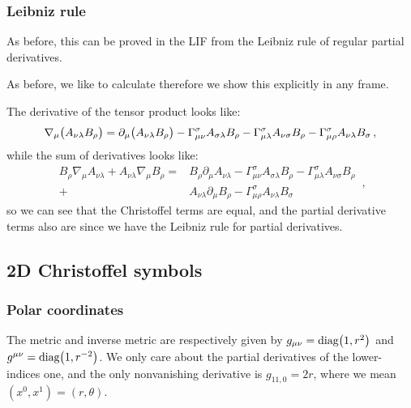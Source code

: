 \documentclass[main.tex]{subfiles}
\begin{document}
\subsubsection{Leibniz rule}

As before, this can be proved in the LIF from the Leibniz rule of regular partial derivatives.

As before, we like to calculate therefore we show this explicitly in any frame.

The derivative of the tensor product looks like: 
%
\begin{equation}
    \nabla_{\mu } \qty(A_{\nu \lambda } B_{ \rho }) = 
    \partial_{\mu }\qty(A_{\nu \lambda }B_{\rho }) 
    -\Gamma_{\mu \nu }^{\sigma }A_{\sigma \lambda }B_{\rho }
    -\Gamma_{\mu \lambda  }^{\sigma }A_{\nu \sigma }B_{\rho }
    -\Gamma_{\mu \rho }^{\sigma }A_{\nu \lambda }B_{\sigma }
\,,
\end{equation}
%
while the sum of derivatives looks like: 
%
\begin{equation}
  \begin{split}
  B_{\rho }\nabla_{\mu }A_{\nu \lambda } 
  + A_{\nu \lambda }\nabla_{\mu }B_{\rho }=
  &B_{\rho }\partial_{\mu }A_{\nu \lambda }
  -\Gamma_{\mu \nu }^{\sigma }A_{\sigma \lambda }B_{\rho }
  -\Gamma_{\mu \lambda  }^{\sigma }A_{\nu \sigma }B_{\rho } \\
  + & A_{\nu \lambda }\partial_{\mu }B_{\rho }
  -\Gamma_{\mu \rho }^{\sigma }A_{\nu \lambda }B_{\sigma }
  \end{split}
  \,,
\end{equation}
%
so we can see that the Christoffel terms are equal, and the partial derivative terms also are since we have the Leibniz rule for partial derivatives.

\subsection{2D Christoffel symbols}

\subsubsection{Polar coordinates}

The metric and inverse metric are respectively given by \(g_{\mu \nu } = \text{diag}\qty(1, r^2)\) and \(g^{\mu \nu }= \text{diag}\qty(1, r^{-2})\). We only care about the partial derivatives of the lower-indices one, and the only nonvanishing derivative is \(g_{11,0} = 2r\), where we mean \((x^{0}, x^{1}) = (r, \theta )\).
\end{document}
